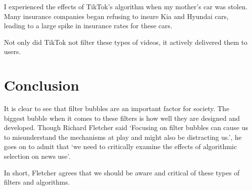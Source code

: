 \documentclass[12pt]{article}
\begin{document}
I experienced the effects of TikTok's algorithm when my mother's car
was stolen. Many insurance companies began refusing to insure Kia and Hyundai
cars, leading to a large spike in insurance rates for these cars.

Not only did TikTok not filter these types of videos, it actively delivered them
to users.

\section{Conclusion}
It is clear to see that filter bubbles are an important factor for society. The
biggest bubble when it comes to these filters is how well they are designed and
developed. Though Richard Fletcher said `Focusing on filter bubbles can cause us
to misunderstand the mechanisms at play and might also be distracting us.', he
goes on to admit that `we need to critically examine the effects of algorithmic
selection on news use'.

In short, Fletcher agrees that we should be aware and critical of these types of
filters and algorithms.

\vfill

\singlespacing
\end{document}
